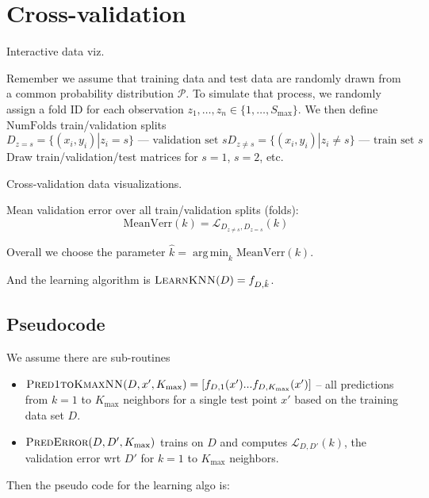 \documentclass{article}
\DeclareMathOperator*{\argmin}{arg\,min}
\begin{document}
\section{Cross-validation}

Interactive data viz.

Remember we assume that training data and test data are randomly drawn
from a common probability distribution $\mathcal P$. To simulate that
process, we randomly assign a fold ID for each observation
$z_1,\dots,z_n\in\{1,\dots, S_\text{max}\}$. We then define
$\text{NumFolds}$ train/validation splits
\begin{equation}
  D_{z=s} = \{(x_i,y_i)|z_i = s\} \text{ --- validation set $s$}
  D_{z\neq s} = \{(x_i,y_i)|z_i \neq s\} \text{ --- train set $s$}
\end{equation}
Draw train/validation/test matrices for $s=1$, $s=2$, etc.

Cross-validation data visualizations.

Mean validation error over all train/validation splits (folds):
\begin{equation}
  \text{MeanVerr}(k) = \mathcal L_{D_{z\neq s},D_{z=s}}(k)
\end{equation}

Overall we choose the parameter $\hat k = \argmin_k \text{MeanVerr}(k)$.

And the learning algorithm is $\textsc{LearnKNN}(D) = f_{D, \hat k}$.

\subsection{Pseudocode}

We assume there are sub-routines
\begin{itemize}
\item
  $\textsc{Pred1toKmaxNN}(D, x', K_{\text{max}}) = [ f_{D, 1}(x')
  ... f_{D, K_{\text{max}}}(x') ]$ -- all predictions from $k=1$ to
  $K_{\text{max}}$ neighbors for a single test point $x'$ based on the training
  data set $D$.
\item $\textsc{PredError}(D, D', K_{\text{max}})$ trains on $D$ and
  computes $\mathcal L_{D,D'}(k)$, the validation error wrt $D'$ for
  $k=1$ to $K_{\text{max}}$ neighbors.
\end{itemize}

Then the pseudo code for the learning algo is:
\end{document}
